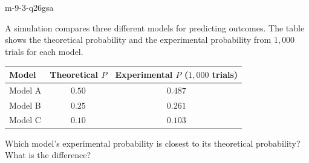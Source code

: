\begin{practiceQuestion}{m-9-3-q26}{gsa}
\begin{questionText}
A simulation compares three different models for predicting outcomes. The table shows the theoretical probability and the experimental probability from $1{,}000$ trials for each model.

\begin{center}
\begin{tabular}{|l|c|c|}
\hline
\textbf{Model} & \textbf{Theoretical $P$} & \textbf{Experimental $P$ ($1{,}000$ trials)} \\
\hline
Model A & $0.50$ & $0.487$ \\
\hline
Model B & $0.25$ & $0.261$ \\
\hline
Model C & $0.10$ & $0.103$ \\
\hline
\end{tabular}
\end{center}

Which model's experimental probability is closest to its theoretical probability? What is the difference?
\end{questionText}
\end{practiceQuestion}

